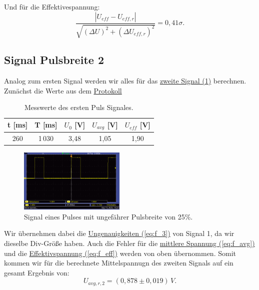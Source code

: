 Und für die Effektivespannung:
\begin{equation}
    \frac{\left| U_{eff} - U_{eff,r} \right|}{\sqrt{(\Delta U)^2 + (\Delta U_{eff,r})^2}} = 0,41\sigma.
\end{equation}

\subsection*{Signal Pulsbreite 2}
Analog zum ersten Signal werden wir alles für das \hyperref[fig:sp_25]{zweite Signal (\ref*{fig:sp_25})} berechnen. Zunächst die Werte aus dem \hyperref[Protokoll]{Protokoll}

\begin{table}[h!]
    \centering
    \begin{tabular}{c | c | c | c | c}
        \toprule
        t [ms] & T [ms] & $U_0$ [V] & $U_{avg}$ [V] & $U_{eff}$ [V] \\
        \hline
        260 & 1\,030  & 3,48 & 1,05 & 1,90 \\
        \bottomrule
    \end{tabular}
    \caption{Messwerte des ersten Puls Signales.}
    \label{tab:sp_1}
\end{table}

\begin{figure} [h!]
    \centering
        \includegraphics[width=0.45\textwidth]{img/25/Puls3/Puls25.pdf}
    \caption{Signal eines Pulses mit ungefährer Pulsbreite von 25\%.}
    \label{fig:sp_25}
\end{figure}

Wir übernehmen dabei die \hyperref[eq:f_3]{Ungenauigkeiten (\ref*{eq:f_3})} von Signal 1, da wir dieselbe Div-Größe haben. Auch die Fehler für die \hyperref[eq:f_avg]{mittlere Spannung (\ref*{eq:f_avg})} und die \hyperref[eq:f_eff]{Effektivspannung (\ref*{eq:f_eff})} werden von oben übernommen.
Somit kommen wir für die berechnete Mittelspannugn des zweiten Signals auf ein gesamt Ergebnis von:
\begin{equation}
    \boxed{
        U_{avg,r,2} = (0,878 \pm 0,019) \, V
    }.
\end{equation}

